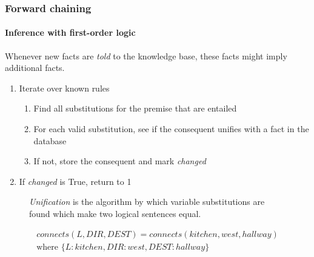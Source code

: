 \begin{frame}
    \frametitle{Forward chaining}
    \framesubtitle{Inference with first-order logic}

    Whenever new facts are \emph{told} to the knowledge base, these
    facts might imply additional facts.

    \begin{enumerate}
        \item Iterate over known rules
            \begin{enumerate}
                \item Find all substitutions for the premise that are
                    entailed
                \item For each valid substitution, see if the consequent
                    unifies with a fact in the database
                \item If not, store the consequent and mark
                    \emph{changed}
            \end{enumerate}
        \item If \emph{changed} is True, return to 1
    \end{enumerate}

    \begin{figure}
        \emph{Unification} is the algorithm by which variable substitutions
        are found which make two logical sentences equal.

        \begin{gather*}
            connects(L, DIR, DEST) = connects(kitchen, west, hallway) \\
            \text{where } \lbrace{L: kitchen, DIR: west, DEST:
            hallway\rbrace}
        \end{gather*}
    \end{figure}
\end{frame}

